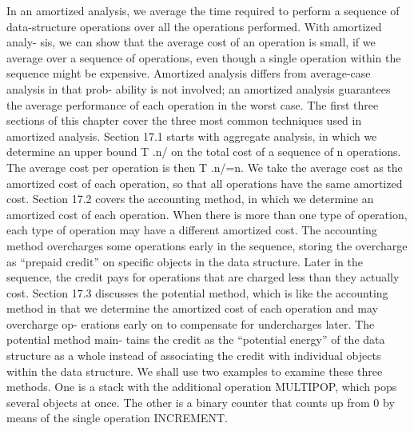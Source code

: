 \documentclass[a4paper, 10pt]{ctexbook} %
\begin{document}
\tableofcontents
In an amortized analysis, we average the time required to perform a sequence of data-structure operations over all the operations performed. With amortized analy- sis, we can show that the average cost of an operation is small, if we average over a sequence of operations, even though a single operation within the sequence might be expensive. Amortized analysis differs from average-case analysis in that prob- ability is not involved; an amortized analysis guarantees the average performance of each operation in the worst case.  The first three sections of this chapter cover the three most common techniques used in amortized analysis. Section 17.1 starts with aggregate analysis, in which we determine an upper bound T .n/ on the total cost of a sequence of n operations.  The average cost per operation is then T .n/=n. We take the average cost as the amortized cost of each operation, so that all operations have the same amortized cost.  Section 17.2 covers the accounting method, in which we determine an amortized cost of each operation. When there is more than one type of operation, each type of operation may have a different amortized cost. The accounting method overcharges some operations early in the sequence, storing the overcharge as “prepaid credit” on specific objects in the data structure. Later in the sequence, the credit pays for operations that are charged less than they actually cost.  Section 17.3 discusses the potential method, which is like the accounting method in that we determine the amortized cost of each operation and may overcharge op- erations early on to compensate for undercharges later. The potential method main- tains the credit as the “potential energy” of the data structure as a whole instead of associating the credit with individual objects within the data structure.  We shall use two examples to examine these three methods. One is a stack with the additional operation MULTIPOP, which pops several objects at once. The other is a binary counter that counts up from 0 by means of the single operation INCREMENT.  
\end{document}
